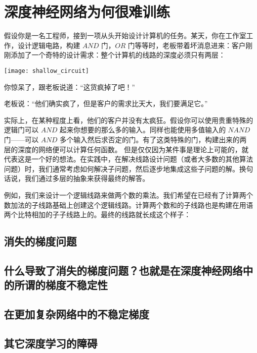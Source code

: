 
\chapter{深度神经网络为何很难训练}
\label{ch:WhyHardToTrain}

假设你是一名工程师，接到一项从头开始设计计算机的任务。某天，你在工作室工作，设计逻辑电路，构建 $AND$ 门，$OR$ 门等等时，老板带着坏消息进来：客户刚刚添加了一个奇特的设计需求：整个计算机的线路的深度必须只有两层：
\begin{center}
  \texttt{[image: shallow\_circuit]}
\end{center}

你惊呆了，跟老板说道：“这货疯掉了吧！” 
 
老板说：“他们确实疯了，但是客户的需求比天大，我们要满足它。” 
 
实际上，在某种程度上看，他们的客户并没有太疯狂。假设你可以使用贵重特殊的逻辑门可以 $AND$ 起来你想要的那么多的输入。同样也能使用多值输入的 $NAND$ 门——可以 $AND$ 多个输入然后求否定的门。有了这类特殊的门，构建出来的两层的深度的网络便可以计算任何函数。 
但是仅仅因为某件事是理论上可能的，就代表这是一个好的想法。在实践中，在解决线路设计问题（或者大多数的其他算法问题）时，我们通常考虑如何解决子问题，然后逐步地集成这些子问题的解。换句话说，我们通过多层的抽象来获得最终的解答。 

例如，我们来设计一个逻辑线路来做两个数的乘法。我们希望在已经有了计算两个数加法的子线路基础上创建这个逻辑线路。计算两个数和的子线路也是构建在用语两个比特相加的子子线路上的。最终的线路就长成这个样子： 

\section{消失的梯度问题}
\label{sec:the_vanishing_gradient_problem}

\section{什么导致了消失的梯度问题？也就是在深度神经网络中的所谓的梯度不稳定性}

\section{在更加复杂网络中的不稳定梯度}

\section{其它深度学习的障碍}